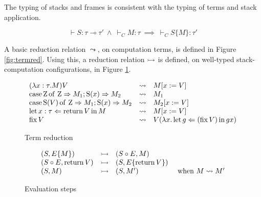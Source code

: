 

\begin{lemma}
    The typing of stacks and frames is consistent
    with the typing of terms and stack application.

    \begin{equation*}
        \vdash S : \tau \multimap \tau'  ~ \wedge ~ 
        \vdash_C M : \tau
        ~ \implies ~
        \vdash_C S\{M\} : \tau'
    \end{equation*}
\end{lemma}


A basic reduction relation $\leadsto$, on computation terms, 
is defined in Figure \ref{fig:termred}. Using this, a reduction relation $\reduces$ is
defined, on well-typed stack-computation configurations, in 
Figure \ref{fig:evalstep}.


\begin{figure}[h]
    \begin{center}
        \begin{equation*}
            \begin{array}{lcl}
                (\lambda x:\tau. M) V & \leadsto & M[x := V] \\
                \lcase{\Zero}{M_1}{M_2} & \leadsto & M_1 \\
                \lcase{\Succ(V)}{M_1}{M_2} & \leadsto & M_2[x := V] \\
                \Bind{\Ret V}{x : \tau}{M} & \leadsto & M[x := V] \\
                \Fix V & \leadsto & V (\lambda x. \Bind{(\Fix V)}{g}{g x})
            \end{array}
        \end{equation*}
    \end{center}
    \caption{Term reduction}
    \label{fig:termred}
    \begin{center}
        \begin{equation*}
            \begin{array}{lclr}
                (S,E\{M\}) & \reduces & (S \circ E, M) \\
                (S \circ E, \Ret V) & \reduces & (S, E \{ \Ret V \}) \\
                (S,M) & \reduces & (S,M') & \text{ when } M \leadsto M'
            \end{array}
        \end{equation*}
    \end{center}
    \caption{Evaluation steps}
    \label{fig:evalstep}
\end{figure}

